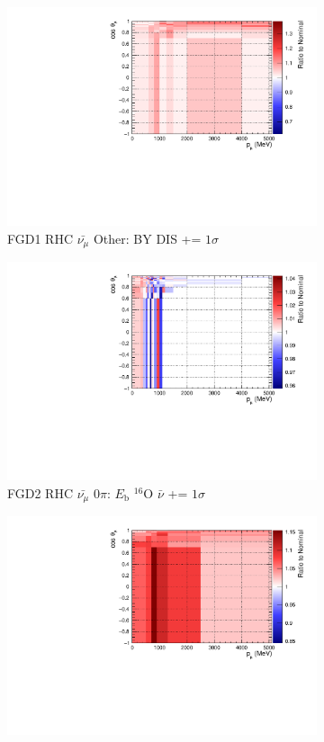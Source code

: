\begin{figure}[!htbp]
\begin{subfigure}{.32\textwidth}
  \includegraphics[width=0.85\linewidth]{figs/sig/FGD1_anti-numuCC_other_CC_BY_DIS_+1sig.pdf}
  \caption{FGD1 RHC $\bar{\nu_{\mu}}$ Other: BY DIS += $1\sigma$}
  \label{fig:sigvar_FGD1_anti-numuCC_other}
\end{subfigure}
\centering
\begin{subfigure}{.32\textwidth}
  \centering
  \includegraphics[width=0.85\linewidth]{figs/sig/FGD2_anti-numuCC_0pi_EB_dial_O_nubar_+1sig.pdf}
  \caption{FGD2 RHC $\bar{\nu_{\mu}}$ 0$\pi$: $E_{\mathrm{b}}$ $^{16}$O $\bar{\nu}$ += $1\sigma$}
  \label{fig:sigvar_FGD2_anti-numuCC_0pi}
\end{subfigure}
\begin{subfigure}{.32\textwidth}
  \centering
  \includegraphics[width=0.85\linewidth]{figs/sig/FGD2_anti-numuCC_1pi_ISO_BKG_+1sig.pdf}

\end{subfigure}
\end{figure}
